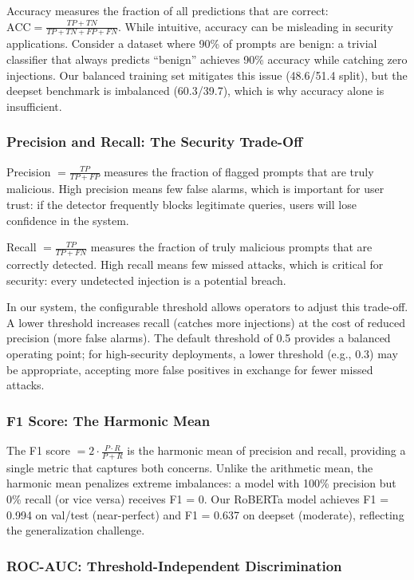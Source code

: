 \documentclass[12pt, letterpaper]{article}   %
\begin{document}
Accuracy measures the fraction of all predictions that are correct: $\text{ACC} = \frac{TP + TN}{TP + TN + FP + FN}$. While intuitive, accuracy can be misleading in security applications. Consider a dataset where 90\% of prompts are benign: a trivial classifier that always predicts ``benign'' achieves 90\% accuracy while catching zero injections. Our balanced training set mitigates this issue (48.6/51.4 split), but the deepset benchmark is imbalanced (60.3/39.7), which is why accuracy alone is insufficient.

\subsubsection{Precision and Recall: The Security Trade-Off}

Precision $= \frac{TP}{TP + FP}$ measures the fraction of flagged prompts that are truly malicious. High precision means few false alarms, which is important for user trust: if the detector frequently blocks legitimate queries, users will lose confidence in the system.

Recall $= \frac{TP}{TP + FN}$ measures the fraction of truly malicious prompts that are correctly detected. High recall means few missed attacks, which is critical for security: every undetected injection is a potential breach.

In our system, the configurable threshold allows operators to adjust this trade-off. A lower threshold increases recall (catches more injections) at the cost of reduced precision (more false alarms). The default threshold of 0.5 provides a balanced operating point; for high-security deployments, a lower threshold (e.g., 0.3) may be appropriate, accepting more false positives in exchange for fewer missed attacks.

\subsubsection{F1 Score: The Harmonic Mean}

The F1 score $= 2 \cdot \frac{P \cdot R}{P + R}$ is the harmonic mean of precision and recall, providing a single metric that captures both concerns. Unlike the arithmetic mean, the harmonic mean penalizes extreme imbalances: a model with 100\% precision but 0\% recall (or vice versa) receives F1 = 0. Our RoBERTa model achieves F1 = 0.994 on val/test (near-perfect) and F1 = 0.637 on deepset (moderate), reflecting the generalization challenge.

\subsubsection{ROC-AUC: Threshold-Independent Discrimination}
\end{document}
